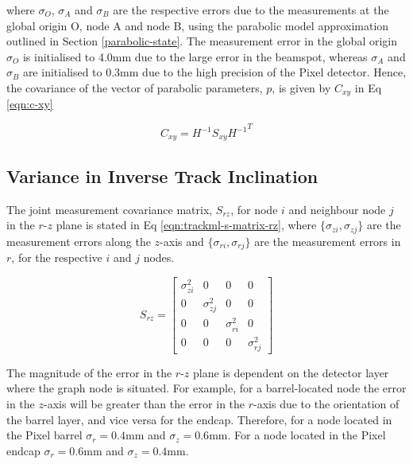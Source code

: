 where $\sigma_O$, $\sigma_A$ and $\sigma_B$ are the respective errors due to the measurements at the global origin O, node A and node B, using the parabolic model approximation outlined in Section \ref{parabolic-state}. The measurement error in the global origin $\sigma_O$ is initialised to 4.0mm due to the large error in the beamspot, whereas $\sigma_A$ and $\sigma_B$ are initialised to 0.3mm due to the high precision of the Pixel detector. Hence, the covariance of the vector of parabolic parameters, $p$, is given by $C_{xy}$ in Eq \eqref{eqn:c-xy}

\begin{equation}
    C_{xy} = H^{-1}S_{xy}{H^{-1}}^{T}
    \label{eqn:c-xy}
\end{equation}






\subsection{Variance in Inverse Track Inclination}
\label{variance-in-inverse-track-inclination}

The joint measurement covariance matrix, $S_{rz}$, for node $i$ and neighbour node $j$ in the $r$-$z$ plane is stated in Eq \eqref{eqn:trackml-s-matrix-rz}, where $\{ \sigma_{zi}, \sigma_{zj} \}$ are the measurement errors along the $z$-axis and $\{ \sigma_{ri}, \sigma_{rj} \}$ are the measurement errors in $r$, for the respective $i$ and $j$ nodes. 

\begin{equation}
    S_{rz} = \begin{bmatrix} \sigma_{zi}^{2} & 0 & 0 & 0 \\ 
                             0 & \sigma_{zj}^{2} & 0 & 0 \\ 
                             0 & 0 & \sigma_{ri}^{2} & 0 \\
                             0 & 0 & 0 & \sigma_{rj}^{2}
                            \end{bmatrix} 
    \label{eqn:trackml-s-matrix-rz}
\end{equation}


The magnitude of the error in the $r$-$z$ plane is dependent on the detector layer where the graph node is situated. For example, for a barrel-located node the error in the $z$-axis will be greater than the error in the $r$-axis due to the orientation of the barrel layer, and vice versa for the endcap. Therefore, for a node located in the Pixel barrel $\sigma_r = 0.4$mm and $\sigma_z = 0.6$mm. For a node located in the Pixel endcap $\sigma_r = 0.6$mm and $\sigma_z = 0.4$mm.

